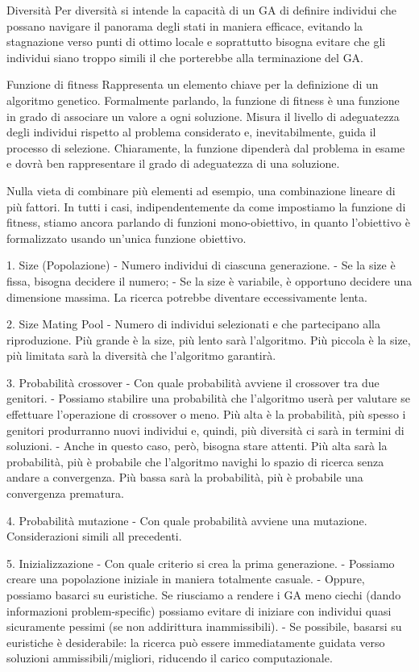 \documentclass{article}
\begin{document}
    Diversità Per diversità si intende la capacità di un GA di definire individui che possano navigare il panorama degli stati in maniera efficace, evitando la
    stagnazione verso punti di ottimo locale e soprattutto bisogna evitare che gli individui siano troppo simili il che porterebbe alla terminazione del GA.

    Funzione di fitness Rappresenta un elemento chiave per la definizione di un algoritmo genetico. Formalmente parlando, la funzione di fitness è una funzione in grado
    di associare un valore a ogni soluzione. Misura il livello di adeguatezza degli individui rispetto al problema considerato e, inevitabilmente, guida il
    processo di selezione. Chiaramente, la funzione dipenderà dal problema in esame e dovrà ben rappresentare il grado di adeguatezza di una soluzione.

    Nulla vieta di combinare più elementi ad esempio, una combinazione lineare di più fattori. In tutti i casi, indipendentemente da come impostiamo la funzione di
    fitness, stiamo ancora parlando di funzioni mono-obiettivo, in quanto l’obiettivo è formalizzato usando un’unica funzione obiettivo.

    1. Size (Popolazione) - Numero individui di ciascuna generazione.
    - Se la size è fissa, bisogna decidere il numero;
    - Se la size è variabile, è opportuno decidere una dimensione massima. La ricerca potrebbe diventare eccessivamente lenta.

    2. Size Mating Pool - Numero di individui selezionati e che partecipano alla riproduzione.
    Più grande è la size, più lento sarà l’algoritmo. Più piccola è la size, più limitata sarà la diversità che l’algoritmo garantirà.

    3. Probabilità crossover - Con quale probabilità avviene il crossover tra due genitori.
    - Possiamo stabilire una probabilità che l’algoritmo userà per valutare se effettuare l’operazione di crossover o meno. Più alta è la probabilità, più spesso i
    genitori produrranno nuovi individui e, quindi, più diversità ci sarà in termini di soluzioni.
    - Anche in questo caso, però, bisogna stare attenti. Più alta sarà la probabilità, più è probabile che l’algoritmo navighi lo spazio di ricerca senza andare a
    convergenza. Più bassa sarà la probabilità, più è probabile una convergenza prematura.

    4. Probabilità mutazione - Con quale probabilità avviene una mutazione.
    Considerazioni simili all precedenti.

    5. Inizializzazione - Con quale criterio si crea la prima generazione.
    - Possiamo creare una popolazione iniziale in maniera totalmente casuale.
    - Oppure, possiamo basarci su euristiche. Se riusciamo a rendere i GA meno ciechi (dando informazioni problem-specific) possiamo evitare di iniziare con individui
    quasi sicuramente pessimi (se non addirittura inammissibili).
    - Se possibile, basarsi su euristiche è desiderabile: la ricerca può essere immediatamente guidata verso soluzioni ammissibili/migliori, riducendo il carico
    computazionale.
\end{document}
